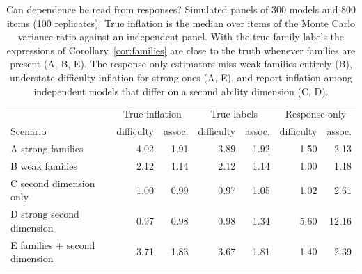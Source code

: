 \begin{table}[!htb]\centering\small
\caption{Can dependence be read from responses? Simulated panels of 300 models and 800 items (100 replicates). True inflation is the median over items of the Monte Carlo variance ratio against an independent panel. With the true family labels the expressions of Corollary~\ref{cor:families} are close to the truth whenever families are present (A, B, E). The response-only estimators miss weak families entirely (B), understate difficulty inflation for strong ones (A, E), and report inflation among independent models that differ on a second ability dimension (C, D).}\label{tab:ident}
\begin{tabular}{lrr|rr|rr}
\toprule
 & \multicolumn{2}{c|}{True inflation} & \multicolumn{2}{c|}{True labels} & \multicolumn{2}{c}{Response-only}\\
Scenario & difficulty & assoc. & difficulty & assoc. & difficulty & assoc.\\
\midrule
A\; strong families & 4.02 & 1.91 & 3.89 & 1.92 & 1.50 & 2.13\\
B\; weak families & 2.12 & 1.14 & 2.12 & 1.14 & 1.00 & 1.18\\
C\; second dimension only & 1.00 & 0.99 & 0.97 & 1.05 & 1.02 & 2.61\\
D\; strong second dimension & 0.97 & 0.98 & 0.98 & 1.34 & 5.60 & 12.16\\
E\; families + second dimension & 3.71 & 1.83 & 3.67 & 1.81 & 1.40 & 2.39\\
\bottomrule
\end{tabular}
\end{table}
